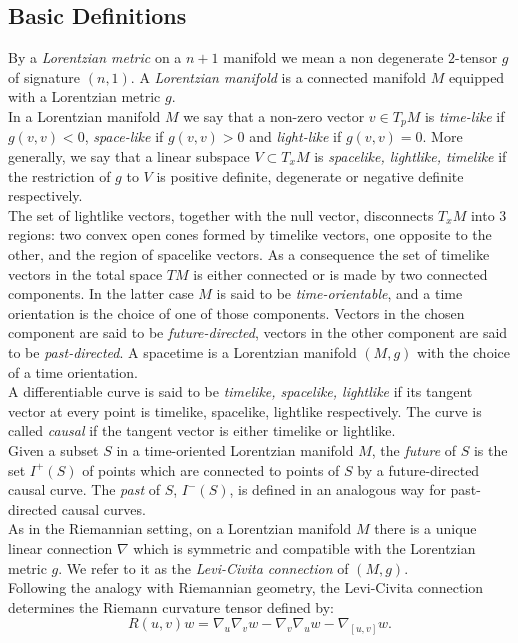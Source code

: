 \subsection{Basic Definitions}
By a \textit{Lorentzian metric} on a $n+1$ manifold we mean a non degenerate $2$-tensor $g$ of signature $(n,1)$. A \textit{Lorentzian manifold} is a connected manifold $M$ equipped with a Lorentzian metric $g$.\\
In a Lorentzian manifold $M$ we say that a non-zero vector $v \in T_pM$ is \textit{time-like} if $g(v,v)<0$, \textit{space-like} if $g(v,v)>0$ and \textit{light-like} if $g(v,v)=0$. More generally, we say that a linear subspace $V \subset T_{x}M$ is \textit{spacelike, lightlike, timelike} if the restriction of $g$ to $V$ is positive definite, degenerate or negative definite respectively.\\
The set of lightlike vectors, together with the null vector, disconnects $T_{x}M$ into 3 regions: two convex open cones formed by timelike vectors, one opposite to the other, and the region of spacelike vectors. As a consequence the set of timelike vectors in the total space $TM$ is either connected or is made by two connected components. In the latter case $M$ is said to be \textit{time-orientable}, and a time orientation is the choice of one of those components. Vectors in the chosen component are said to be \textit{future-directed}, vectors in the other component are said to be \textit{past-directed}. A spacetime is a Lorentzian manifold $(M,g)$ with the choice of a time orientation.\\
A differentiable curve is said to be \textit{timelike, spacelike, lightlike} if its tangent vector at every point is timelike, spacelike, lightlike respectively. The curve is called \textit{causal} if the tangent vector is either timelike or lightlike. \\ Given a subset $S$ in a time-oriented Lorentzian manifold $M$, the \textit{future} of $S$ is the set $I^+(S)$ of points which are connected to points of $S$ by a future-directed causal curve. The \textit{past} of $S$, $I^-(S)$, is defined in an analogous way for past-directed causal curves.\\As in the Riemannian setting, on a Lorentzian manifold $M$ there is a unique linear connection $\nabla$ which is symmetric and compatible with the Lorentzian metric $g$. We refer to it as the \textit{Levi-Civita connection} of $(M,g)$.\\ Following the analogy with Riemannian geometry, the Levi-Civita connection determines the Riemann curvature tensor defined by: 
\[
    R(u,v)w=\nabla_u\nabla_v w-\nabla_v\nabla_u w-\nabla_{[u,v]}w.
\]  


